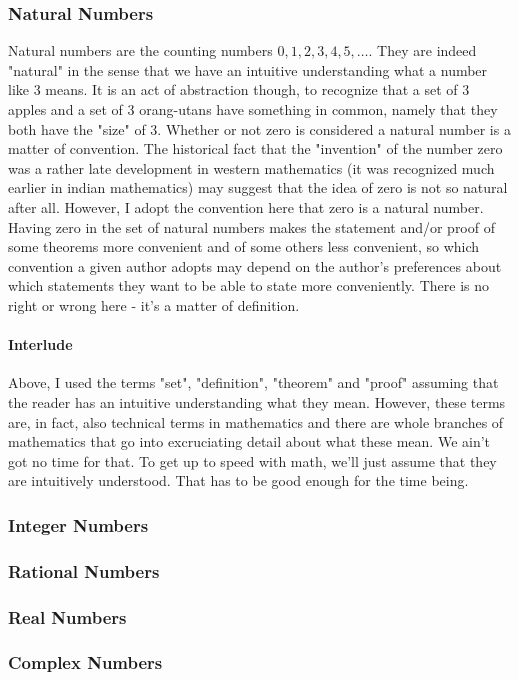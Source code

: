 \subsubsection{Natural Numbers}
Natural numbers are the counting numbers $0,1,2,3,4,5,\ldots$. They are indeed "natural" in the sense that we have an intuitive understanding what a number like $3$ means. It is an act of abstraction though, to recognize that a set of 3 apples and a set of 3 orang-utans have something in common, namely that they both have the "size" of 3. Whether or not zero is considered a natural number is a matter of convention. The historical fact that the "invention" of the number zero was a rather late development in western mathematics (it was recognized much earlier in indian mathematics) may suggest that the idea of zero is not so natural after all. However, I adopt the convention here that zero is a natural number. Having zero in the set of natural numbers makes the statement and/or proof of some theorems more convenient and of some others less convenient, so which convention a given author adopts may depend on the author's preferences about which statements they want to be able to state more conveniently. There is no right or wrong here - it's a matter of definition.

\paragraph{Interlude} Above, I used the terms "set", "definition", "theorem" and "proof" assuming that the reader has an intuitive understanding what they mean. However, these terms are, in fact, also technical terms in mathematics and there are whole branches of mathematics that go into excruciating detail about what these mean. We ain't got no time for that. To get up to speed with math, we'll just assume that they are intuitively understood. That has to be good enough for the time being.

\paragraph{}

\subsubsection{Integer Numbers}


\subsubsection{Rational Numbers}


\subsubsection{Real Numbers}


\subsubsection{Complex Numbers}